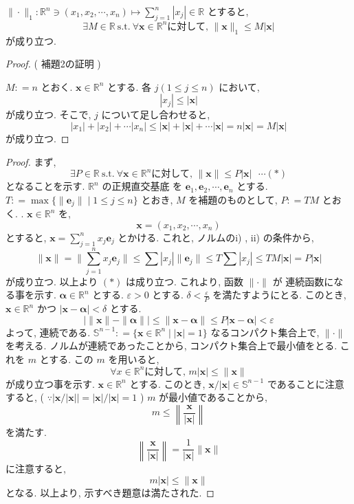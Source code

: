 \documentclass[dvipdfmx,uplatex,11pt]{jsarticle}
\begin{document}
	$\| \cdot \|_1 : \mathbb R^n \ni ( x_1 , x_2 , \cdots , x_n ) \mapsto \sum_{j=1} ^ n |x_j| \in \mathbb R$ とすると, 
%		
		\[
			\exists M \in \mathbb R \ \mathrm{s.t.} \ \forall \bm x \in \mathbb R^n \text {に対して, } \| \bm x \|_1 \leq M | \bm x | 
		\]
%		
	が成り立つ. 
\begin{proof} ( 補題2の証明 )
	
	$M : = n$ とおく. $\bm x \in \mathbb R^n$ とする. 各 $j ( 1 \leq j \leq n )$ において, 
%		
		\[
			| x_j | \leq | \bm x |
		\]
%		
	が成り立つ. そこで, $j$ について足し合わせると, 
%		
		\[
			| x_1 | + | x_2 | + \cdots | x_n | \leq | \bm x | + | \bm x | + \cdots | \bm x | = n | \bm x | = M | \bm x | 
		\]
%		
	が成り立つ. 
\end{proof}
\dotfill
\begin{leftbar}
\begin{proof}
	まず, 
%		
		\[
			\exists P \in \mathbb R \ \mathrm{s.t.} \ \forall \bm x \in \mathbb R^n \text {に対して, } \| \bm x \| \leq P | \bm x | \ \ \ \cdots ( \ast )
		\]
%		
	となることを示す. $\mathbb R^n$ の正規直交基底 を $\bm e_1 , \bm e_2 , \cdots , \bm e_n$ とする. $T : = \max \{ \| \bm e_j \| \mid 1 \leq j \leq n \}$ とおき, $M$ を補題のものとして, $P : = TM$ とおく. . $\bm x \in \mathbb R ^n$ を, 
%		
		\[
			\bm x = ( x_1 , x_2 , \cdots , x_n )
		\]
%		
	とすると, $\bm x = \sum_{j=1} ^ n x_j \bm e_j$ とかける. これと, ノルムのi) , ii) の条件から, 
%		
		\[
			\| \bm x \| = \| \sum_{j=1} ^ n x_j \bm e_j \| \leq \sum | x_j | \| \bm e_j \| \leq T \sum | x_j | \leq T M | \bm x | = P | \bm x |
		\]
%		
	が成り立つ. 以上より $( \ast )$ は成り立つ. これより, 函数 $\| \cdot \|$ が 連続函数になる事を示す. $\bm \alpha \in \mathbb R^n$ とする. $\varepsilon > 0$ とする. $\delta < \frac {\varepsilon} {P}$ を満たすようにとる. このとき, 
	$\bm x \in \mathbb R^n$ かつ $| \bm x - \bm \alpha | < \delta$ とする. 
%		
		\[
			| \| \bm x \| - \| \bm \alpha \| | \leq \| \bm x - \bm \alpha \| \leq P | \bm x - \bm \alpha | < \varepsilon
		\] 
%		
	よって, 連続である.  $\mathbb S^{n-1} : =\{ \bm x \in \mathbb R^n \mid | \bm x | = 1 \}$ なるコンパクト集合上で, $\| \cdot \|$ を考える. ノルムが連続であったことから, コンパクト集合上で最小値をとる. これを $m$ とする. この 
	$m$ を用いると, 
%		
		\[
			\forall x \in \mathbb R^n \text {に対して, } m | \bm x | \leq \| \bm x \|
		\]
%		
	が成り立つ事を示す. $\bm x \in \mathbb R^n$ とする. このとき, $\bm x / | \bm x | \in \mathbb S^{n-1}$ であることに注意すると, ( $\because | \bm x / | \bm x | | = | \bm x | / | \bm x | = 1 $ ) $m$ が最小値であることから, 
%		
		\[
			m \leq \left \| \frac {\bm x} {| \bm x |} \right \|
		\]
%		
	を満たす. 
%		
		\[
			\left \| \frac {\bm x} {| \bm x |} \right \| = \frac {1} {| \bm x |} \| \bm x \|
		\]
%		
	に注意すると, 
%		
		\[
			m | \bm x | \leq \| \bm x \|
		\]
%		
	となる. 以上より, 示すべき題意は満たされた.	
\end{proof}
\end{leftbar}
\end{document}
